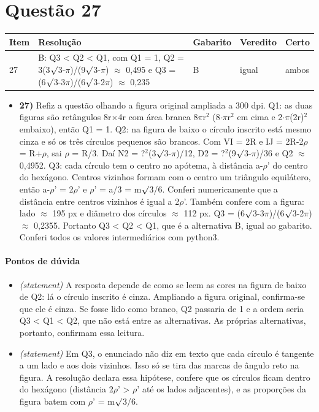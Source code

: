 \documentclass{article}%
\begin{document}
\section*{Questão 27}%
\begin{longtable}{@{}p{} p{} p{} p{} p{}@{}}\toprule Item & Resolução & Gabarito & Veredito & Certo \\ \midrule
27 & B: Q3 < Q2 < Q1, com Q1 = 1, Q2 = 3(3$\surd$3-$\pi$)/(9$\surd$3-$\pi$) $\approx$ 0,495 e Q3 = (6$\surd$3-3$\pi$)/(6$\surd$3-2$\pi$) $\approx$ 0,235 & B & igual & ambos \\
\bottomrule\end{longtable}%
\begin{itemize}%
\item%
\textbf{27)} Refiz a questão olhando a figura original ampliada a 300 dpi. Q1: as duas figuras são retângulos 8r$\times$4r com área branca 8$\pi$r$^2$ (8$\cdot$$\pi$r$^2$ em cima e 2$\cdot$$\pi$(2r)$^2$ embaixo), então Q1 = 1. Q2: na figura de baixo o círculo inscrito está mesmo cinza e só os três círculos pequenos são brancos. Com VI = 2R e IJ = 2R-2$\rho$ = R+$\rho$, sai $\rho$ = R/3. Daí N2 = ?$^2$(3$\surd$3-$\pi$)/12, D2 = ?$^2$(9$\surd$3-$\pi$)/36 e Q2 $\approx$ 0,4952. Q3: cada círculo tem o centro no apótema, à distância a-$\rho$' do centro do hexágono. Centros vizinhos formam com o centro um triângulo equilátero, então a-$\rho$' = 2$\rho$' e $\rho$' = a/3 = m$\surd$3/6. Conferi numericamente que a distância entre centros vizinhos é igual a 2$\rho$'. Também confere com a figura: lado $\approx$ 195 px e diâmetro dos círculos $\approx$ 112 px. Q3 = (6$\surd$3-3$\pi$)/(6$\surd$3-2$\pi$) $\approx$ 0,2355. Portanto Q3 < Q2 < Q1, que é a alternativa B, igual ao gabarito. Conferi todos os valores intermediários com python3.%
\end{itemize}%
\paragraph{Pontos de dúvida}%
\begin{itemize}%
\item%
\textit{(statement)} A resposta depende de como se leem as cores na figura de baixo de Q2: lá o círculo inscrito é cinza. Ampliando a figura original, confirma{-}se que ele é cinza. Se fosse lido como branco, Q2 passaria de 1 e a ordem seria Q3 < Q1 < Q2, que não está entre as alternativas. As próprias alternativas, portanto, confirmam essa leitura.%
\item%
\textit{(statement)} Em Q3, o enunciado não diz em texto que cada círculo é tangente a um lado e aos dois vizinhos. Isso só se tira das marcas de ângulo reto na figura. A resolução declara essa hipótese, confere que os círculos ficam dentro do hexágono (distância 2$\rho$' > $\rho$' até os lados adjacentes), e as proporções da figura batem com $\rho$' = m$\surd$3/6.%
\end{itemize}%
\end{document}

